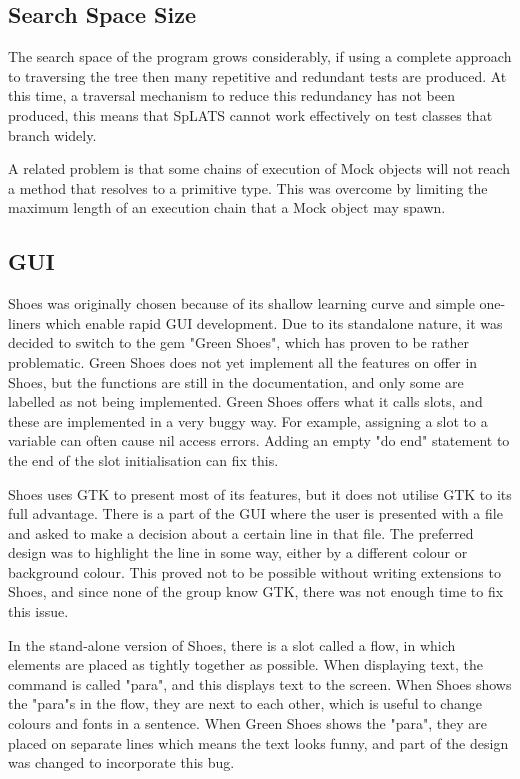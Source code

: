   \subsection{Search Space Size}
    The search space of the program grows considerably, if using a complete
approach to traversing the tree then many repetitive and redundant tests are
produced. At this time, a traversal mechanism to reduce this redundancy has not
been produced, this means that SpLATS cannot work effectively on test classes
that branch widely.

    A related problem is that some chains of execution of Mock objects will not
reach a method that resolves to a primitive type. This was overcome by limiting
the maximum length of an execution chain that a Mock object may spawn.

  \subsection{GUI}
    Shoes was originally chosen because of its shallow learning curve and simple one-liners which enable rapid GUI development. Due to its standalone nature, it was decided to switch to the gem "Green Shoes", which has proven to be rather problematic. Green Shoes does not yet implement all the features on offer in Shoes, but the functions are still in the documentation, and only some are labelled as not being implemented. Green Shoes offers what it calls slots, and these are implemented in a very buggy way. For example, assigning a slot to a variable can often cause nil access errors. Adding an empty "do end" statement to the end of the slot initialisation can fix this. 
    
    Shoes uses GTK to present most of its features, but it does not utilise GTK to its full advantage. There is a part of the GUI where the user is presented with a file and asked to make a decision about a certain line in that file. The preferred design was to highlight the line in some way, either by a different colour or background colour. This proved not to be possible without writing extensions to Shoes, and since none of the group know GTK, there was not enough time to fix this issue.
    
    In the stand-alone version of Shoes, there is a slot called a flow, in which elements are placed as tightly together as possible. When displaying text, the command is called "para", and this displays text to the screen. When Shoes shows the "para"s in the flow, they are next to each other, which is useful to change colours and fonts in a sentence. When Green Shoes shows the "para", they are placed on separate lines which means the text looks funny, and part of the design was changed to incorporate this bug.
